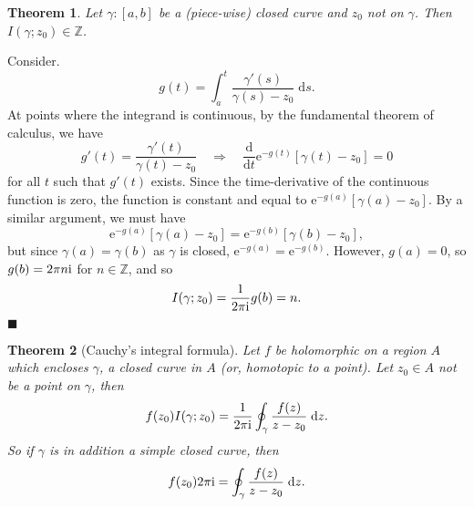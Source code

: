 \documentclass[letter-paper]{tufte-book}
\newtheorem{theorem}{\color{pastel-blue}Theorem}[section]
\newenvironment{proof}[1][Proof]{\begin{trivlist}
\item[\hskip \labelsep {\bfseries #1}]}{\end{trivlist}}
\newcommand{\ex}{\mathrm{e}}
\newcommand{\zi}{{\rm i}}
\newcommand{\qed}{\hfill$\blacksquare$}
\begin{document}
\begin{theorem}
  Let $\gamma : [a,b]$ be a (piece-wise) closed curve and $z_0$ not on $\gamma$.
  Then $I(\gamma; z_0) \in \mathbb{Z}$.
\end{theorem}
\begin{proof}
  Consider.
  \begin{equation*}
    g(t) = \int_a^t \frac{\gamma'(s)}{\gamma(s) - z_0}\; \mathrm{d}s.
  \end{equation*}
  At points where the integrand is continuous, by the fundamental theorem of
  calculus, we have
  \begin{equation*}
    g'(t) = \frac{\gamma'(t)}{\gamma(t) - z_0} \quad \Rightarrow \quad \frac{\mathrm{d}}{\mathrm{d}t} \ex^{-g(t)}[\gamma(t) - z_0] = 0
  \end{equation*}
  for all $t$ such that $g'(t)$ exists. Since the time-derivative of the
  continuous function is zero, the function is constant and equal to
  $\ex^{-g(a)}[\gamma(a) - z_0]$. By a similar argument, we must have
  \begin{equation*}
    \ex^{-g(a)}[\gamma(a) - z_0] = \ex^{-g(b)}[\gamma(b) - z_0],
  \end{equation*}
  but since $\gamma(a) = \gamma(b)$ as $\gamma$ is closed, $\ex^{-g(a)} =
  \ex^{-g(b)}$. However, $g(a) = 0$, so $g(b) = 2\pi n\zi$ for $n\in\mathbb{Z}$,
  and so
  \begin{equation*}
    I(\gamma; z_0) = \frac{1}{2\pi\zi}g(b) = n.
  \end{equation*}
  \qed
\end{proof}

\begin{theorem}[Cauchy's integral formula]
  Let $f$ be holomorphic on a region $A$ which encloses $\gamma$, a closed curve
  in $A$ (or, \emph{homotopic} to a point). Let $z_0 \in A$ not be a point on
  $\gamma$, then
  \begin{equation*}
    f(z_0) I(\gamma; z_0) = \frac{1}{2\pi\zi} \oint_\gamma \frac{f(z)}{z - z_0}\; \mathrm{d}z.
  \end{equation*}
  So if $\gamma$ is in addition a simple closed curve, then
  \begin{equation*}
    f(z_0) 2\pi\zi = \oint_\gamma \frac{f(z)}{z - z_0}\; \mathrm{d}z.
  \end{equation*}
\end{theorem}
\end{document}
